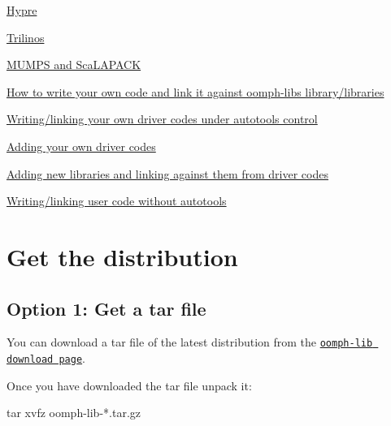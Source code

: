 \begin{DoxyEnumerate}
\begin{DoxyEnumerate}
\begin{DoxyEnumerate}
\item \hyperlink{index_hypre}{Hypre}
\item \hyperlink{index_trilinos}{Trilinos}
\item \hyperlink{index_mumps}{M\+U\+M\+PS and Sca\+L\+A\+P\+A\+CK}
\end{DoxyEnumerate}
\end{DoxyEnumerate}
\item \hyperlink{index_own}{How to write your own code and link it against oomph-\/lib\textquotesingle{}s library/libraries}
\begin{DoxyEnumerate}
\item \hyperlink{index_have_auto_tools}{Writing/linking your own driver codes under autotools control}
\begin{DoxyEnumerate}
\item \hyperlink{index_add_driver}{Adding your own driver codes}
\item \hyperlink{index_add_src}{Adding new libraries and linking against them from driver codes}
\end{DoxyEnumerate}
\item \hyperlink{index_dont_have_auto_tools}{Writing/linking user code without autotools}
\end{DoxyEnumerate}
\end{DoxyEnumerate}

 

\hypertarget{index_download}{}\section{Get the distribution}\label{index_download}
\hypertarget{index_tar_file}{}\subsection{Option 1\+: Get a tar file}\label{index_tar_file}
You can download a tar file of the latest distribution from the \href{../../download/html/index.html}{\tt oomph-\/lib download page}.

Once you have downloaded the tar file unpack it\+:


\begin{DoxyCode}
tar xvfz oomph-lib-*.tar.gz
\end{DoxyCode}


